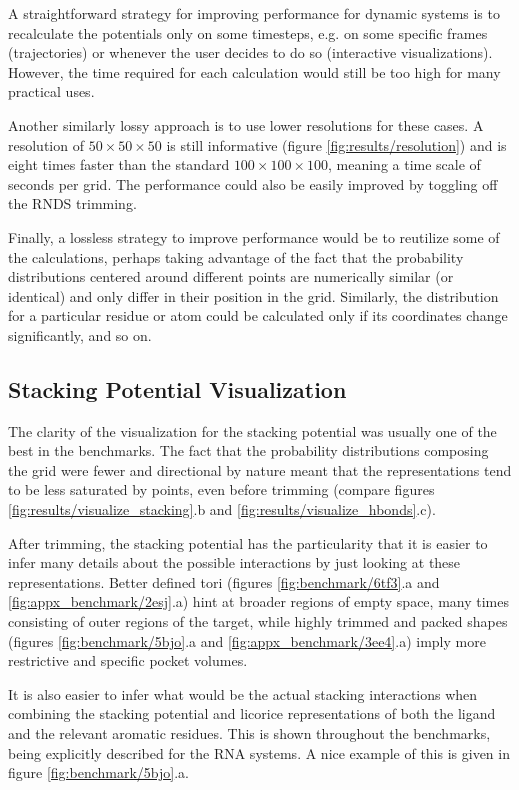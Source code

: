     A straightforward strategy for improving performance for dynamic systems is to recalculate the potentials only on some timesteps, e.g. on some specific frames (trajectories) or whenever the user decides to do so (interactive visualizations). However, the time required for each calculation would still be too high for many practical uses.

    Another similarly lossy approach is to use lower resolutions for these cases. A resolution of $50 \times 50 \times 50$ is still informative (figure \ref{fig:results/resolution}) and is eight times faster than the standard $100 \times 100 \times 100$, meaning a time scale of seconds per grid. The performance could also be easily improved by toggling off the RNDS trimming.

    Finally, a lossless strategy to improve performance would be to reutilize some of the calculations, perhaps taking advantage of the fact that the probability distributions centered around different points are numerically similar (or identical) and only differ in their position in the grid. Similarly, the distribution for a particular residue or atom could be calculated only if its coordinates change significantly, and so on.

  \subsection{Stacking Potential Visualization}
    The clarity of the visualization for the stacking potential was usually one of the best in the benchmarks. The fact that the probability distributions composing the grid were fewer and directional by nature meant that the representations tend to be less saturated by points, even before trimming (compare figures \ref{fig:results/visualize_stacking}.b and \ref{fig:results/visualize_hbonds}.c).

    After trimming, the stacking potential has the particularity that it is easier to infer many details about the possible interactions by just looking at these representations. Better defined tori (figures \ref{fig:benchmark/6tf3}.a and \ref{fig:appx_benchmark/2esj}.a) hint at broader regions of empty space, many times consisting of outer regions of the target, while highly trimmed and packed shapes (figures \ref{fig:benchmark/5bjo}.a and \ref{fig:appx_benchmark/3ee4}.a) imply more restrictive and specific pocket volumes.

    It is also easier to infer what would be the actual stacking interactions when combining the stacking potential and licorice representations of both the ligand and the relevant aromatic residues. This is shown throughout the benchmarks, being explicitly described for the RNA systems. A nice example of this is given in figure \ref{fig:benchmark/5bjo}.a.

